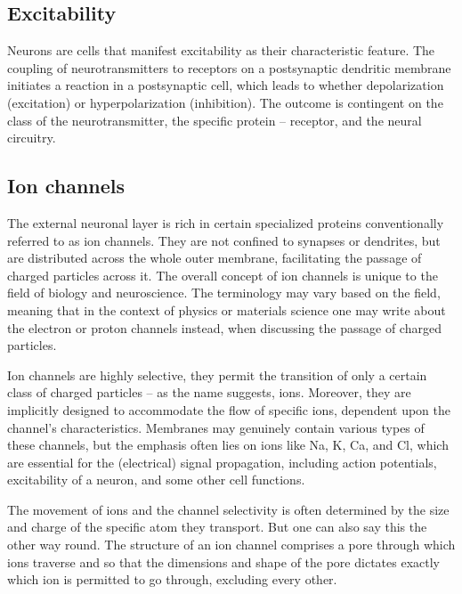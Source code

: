 \documentclass[class={myRUCProject}, crop=false]{standalone}
\begin{document}
\subsection*{Excitability}

Neurons are cells that manifest excitability as their characteristic feature. The coupling of neurotransmitters to receptors on a postsynaptic dendritic membrane initiates a reaction in a postsynaptic cell, which leads to whether depolarization (excitation) or hyperpolarization (inhibition). The outcome is contingent on the class of the neurotransmitter, the specific protein – receptor, and the neural circuitry.

\subsection*{Ion channels}

The external neuronal layer is rich in certain specialized proteins conventionally referred to as ion channels. They are not confined to synapses or dendrites, but are distributed across the whole outer membrane, facilitating the passage of charged particles across it. 
The overall concept of ion channels is unique to the field of biology and neuroscience. The terminology may vary based on the field, meaning that in the context of physics or materials science one may write about the electron or proton channels instead, when discussing the passage of charged particles.

Ion channels are highly selective, they permit the transition of only a certain class of charged particles – as the name suggests, ions. 
Moreover, they are implicitly designed to accommodate the flow of specific ions, dependent upon the channel’s characteristics. 
Membranes may genuinely contain various types of these channels, but the emphasis often lies on ions like \gls{Na}, \gls{K}, \gls{Ca}, and \gls{Cl}, which are essential for the (electrical) signal propagation, including action potentials, excitability of a neuron, and some other cell functions.

The movement of ions and the channel selectivity is often determined by the size and charge of the specific atom they transport. 
But one can also say this the other way round. The structure of an ion channel comprises a pore through which ions traverse and so that the dimensions and shape of the pore dictates exactly which ion is permitted to go through, excluding every other. 
\end{document}
